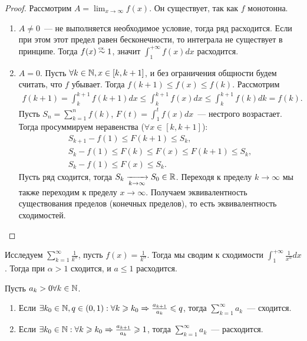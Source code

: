 \documentclass[../main.tex]{subfiles}
\begin{document}
\begin{proof}
  Рассмотрим $A = \lim_{x \to \infty } f(x)$. Он существует, так как $f$ монотонна. 
  \begin{enumerate}
    \item $A \neq 0$~--- не выполняется необходимое условие, тогда ряд расходится. Если при этом этот предел равен бесконечности, то интеграла не существует в принципе. Тогда $f(x) \eqincon 1$, значит $ \int_{1}^{+\infty} f(x) dx $ расходится.
    \item $A = 0$.  Пусть $\forall k\in\mathbb{N}, x \in [k, k+1]$, и без ограничения общности будем считать, что $f$ убывает. Тогда $f(k+1) \leq f(x)  \leq f(k)$. Рассмотрим 
    \begin{gather} 
      f(k+1) = \int_{k}^{k+1} f(k+1) dx \leq \int_{k}^{k+1} f(x) dx \leq \int_{k}^{k+1} f(k) dk = f(k).
    \end{gather} 
    Пусть $S_n = \sum_{k=1}^{n} f(k) $, $F(t) = \int_{1}^{t} f(x) dx$~--- нестрого возрастает. Тогда просуммируем неравенства ($\forall x \in [k, k+1]$): 
    \begin{gather} 
      S_{k+1} - f(1) \leq F(k+1) \leq S_k , \\
      S_{k} - f(1) \leq F(k) \leq F(x) \leq F(k+1) \leq S_k, \\
      S_k - f(1) \leq F(x) \leq S_k. 
    \end{gather} 
    Пусть ряд сходится, тогда $S_k  \xrightarrow[k \to  \infty ]{} S_0 \in \mathbb{R} $. Переходя к пределу $k \to \infty$ мы также переходим к пределу $x \to \infty$. Получаем эквивалентность существования пределов (конечных пределов), то есть эквивалентность сходимостей.   
    
  \end{enumerate}
\end{proof}

\begin{example}
  Исследуем $ \sum_{k=1}^{\infty} \frac{1}{k^{\alpha}} $, пусть $f(x) = \frac{1}{k^{\alpha}}$. Тогда мы сводим к сходимости $\int_{1}^{+\infty} \frac{1}{x^{\alpha}} dx$. Тогда при $\alpha > 1$ сходится, и $a \leq 1$ расходится.  
\end{example}


\begin{proposition}
  Пусть $ a_k > 0 \forall k \in \mathbb{N}$.
  \begin{enumerate}
    \item Если $\exists k_0 \in \mathbb{N}, q \in (0, 1) : \forall k \geqslant k_0 \Rightarrow \frac{a_{k+1}}{a_k } \leqslant q$, тогда $ \sum_{k=1}^{\infty} a_k $~--- сходится. 
    \item Если $\exists k_0 \in \mathbb{N} : \forall k \geqslant k_0 \Rightarrow \frac{a_{k+1}}{a_k } \geqslant 1$, тогда $ \sum_{k=1}^{\infty} a_k $~--- расходится.
  \end{enumerate}
\end{proposition}
\end{document}
